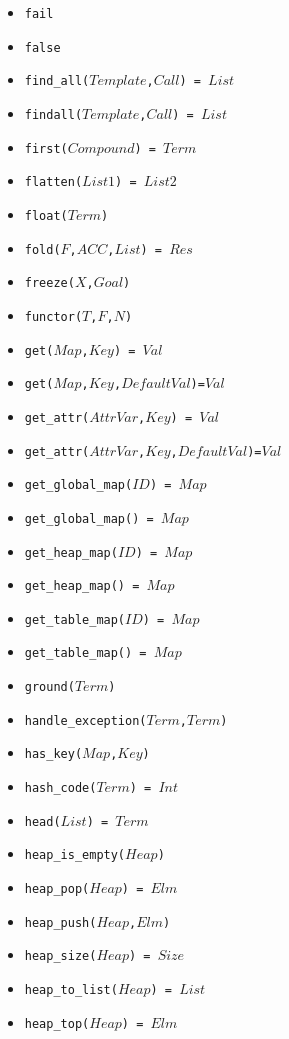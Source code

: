\documentclass[10pt]{article}
\begin{document}
\begin{multicols}{2}
\begin{scriptsize}
\begin{itemize}
    \item \texttt{fail}
    \item \texttt{false}
    \item \texttt{find\_all($Template$,$Call$) = $List$}
    \item \texttt{findall($Template$,$Call$) = $List$}
    \item \texttt{first($Compound$) = $Term$} 
    \item \texttt{flatten($List1$) = $List2$} 
    \item \texttt{float($Term$)} 
    \item \texttt{fold($F$,$ACC$,$List$) = $Res$} 
    \item \texttt{freeze($X$,$Goal$)}
    \item \texttt{functor($T$,$F$,$N$)}
    \item \texttt{get($Map$,$Key$) = $Val$}
    \item \texttt{get($Map$,$Key$,$DefaultVal$)=$Val$} 
    \item \texttt{get\_attr($AttrVar$,$Key$) = $Val$}
    \item \texttt{get\_attr($AttrVar$,$Key$,$DefaultVal$)=$Val$} 
    \item \texttt{get\_global\_map($ID$) = $Map$}
    \item \texttt{get\_global\_map() = $Map$}
    \item \texttt{get\_heap\_map($ID$) = $Map$} 
    \item \texttt{get\_heap\_map() = $Map$} 
    \item \texttt{get\_table\_map($ID$) = $Map$} 
    \item \texttt{get\_table\_map() = $Map$} 
    \item \texttt{ground($Term$)} 
    \item \texttt{handle\_exception($Term$,$Term$)} 
    \item \texttt{has\_key($Map$,$Key$)} 
    \item \texttt{hash\_code($Term$) = $Int$} 
    \item \texttt{head($List$) = $Term$} 
    \item \texttt{heap\_is\_empty($Heap$)}
    \item \texttt{heap\_pop($Heap$) = $Elm$}
    \item \texttt{heap\_push($Heap$,$Elm$)}
    \item \texttt{heap\_size($Heap$) = $Size$}
    \item \texttt{heap\_to\_list($Heap$) = $List$}
    \item \texttt{heap\_top($Heap$) = $Elm$}

\end{itemize}
\end{scriptsize}
\end{multicols}
\end{document}
